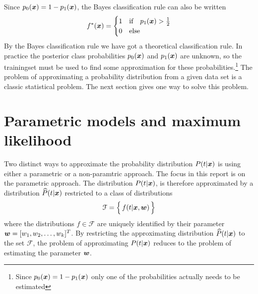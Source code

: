     Since $p_0(\boldsymbol{x})=1-p_1(\boldsymbol{x})$, the Bayes classification rule can also be written
    \[
        f^*(\boldsymbol{x}) = \begin{cases}
            1 & \text{if}\quad p_1(\boldsymbol{x}) > \frac{1}{2} \\
            0 & \text{else}
        \end{cases}
    \]
    By the Bayes classification rule we have got a theoretical classification rule. In practice the posterior class probabilities $p_0(\boldsymbol{x})$ and $p_1(\boldsymbol{x})$ are unknown, so the trainingset must be used to find some approximation for these probabilities.\footnote{Since $p_0(\boldsymbol{x})=1-p_1(\boldsymbol{x})$ only one of the probabilities actually needs to be estimated}  The problem of approximating a probability distribution from a given data set is a classic statistical problem. The next section gives one way to solve this problem.

\section{Parametric models and maximum likelihood}\label{sec:parametric-models-and-likelihood}
Two distinct ways to approximate the probability distribution $P(t|\boldsymbol{x})$ is using either a parametric or a non-paramtric approach. The focus in this report is on the parametric approach. The distribution $P(t|\boldsymbol{x})$, is therefore approximated by a distribution $\widehat{P}(t|\boldsymbol{x})$ restricted to a class of distributions
\[
    \mathcal{F} = \Bigl\{\,f(t|\boldsymbol{x},\boldsymbol{w})\,\Bigr\}
\]
where the distributions $f\in\mathcal{F}$ are uniquely identified by their parameter $\boldsymbol{w}=[w_1, w_2, \dots, w_k]^T$. By restricting the approximating distribution $\widehat{P}(t|\boldsymbol{x})$ to the set $\mathcal{F}$, the problem of approximating $P(t|\boldsymbol{x})$ reduces to the problem of estimating the parameter $\boldsymbol{w}$.


